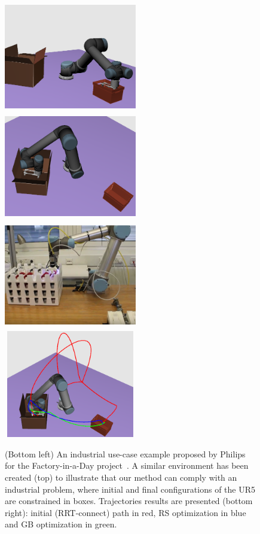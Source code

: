 \documentclass{tADR2e}
\begin{document}
\begin{figure}
	\centering
	\includegraphics[width=5.8cm,height=4.7cm]{fiad_qinit.png}
	\includegraphics[width=5.8cm,height=4.7cm]{fiad_qfinal.png}\\
	\includegraphics[width=5.8cm,height=4.7cm]{fiad_real.png}
	\includegraphics[width=5.8cm,height=4.7cm]{fiad-trajectorires.png}
	\caption{(Bottom left) An industrial use-case example proposed by Philips for 	
	the Factory-in-a-Day project~\cite{factory-day-video}. A similar environment 	
	has been created (top) to illustrate that our method can comply with an 
	industrial problem, where initial and final configurations of the UR5 are 
	constrained in boxes. Trajectories results 
	are presented (bottom right): initial (RRT-connect) path in red, RS 
	optimization in blue and GB optimization in green.}
	\label{fiad}
\end{figure}
\end{document}
